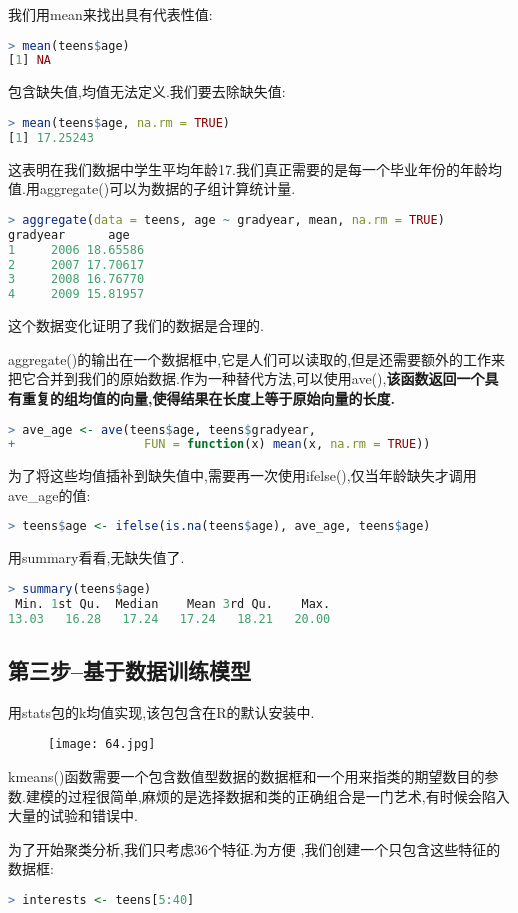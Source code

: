 \documentclass[11pt,a4paper,oneside]{book}
\begin{document}
我们用mean来找出具有代表性值:
\begin{lstlisting}[language=r]
> mean(teens$age) 
[1] NA
\end{lstlisting}
包含缺失值,均值无法定义.我们要去除缺失值:
\begin{lstlisting}[language=r]
> mean(teens$age, na.rm = TRUE) 
[1] 17.25243
\end{lstlisting}
这表明在我们数据中学生平均年龄17.我们真正需要的是每一个毕业年份的年龄均值.用aggregate()可以为数据的子组计算统计量.
\begin{lstlisting}[language=r]
> aggregate(data = teens, age ~ gradyear, mean, na.rm = TRUE)
gradyear      age
1     2006 18.65586
2     2007 17.70617
3     2008 16.76770
4     2009 15.81957
\end{lstlisting}
这个数据变化证明了我们的数据是合理的.

aggregate()的输出在一个数据框中,它是人们可以读取的,但是还需要额外的工作来把它合并到我们的原始数据.作为一种替代方法,可以使用ave(),\textbf{该函数返回一个具有重复的组均值的向量,使得结果在长度上等于原始向量的长度.}
\begin{lstlisting}[language=r]
> ave_age <- ave(teens$age, teens$gradyear,
+                  FUN = function(x) mean(x, na.rm = TRUE))
\end{lstlisting}

为了将这些均值插补到缺失值中,需要再一次使用ifelse(),仅当年龄缺失才调用ave\_age的值:
\begin{lstlisting}[language=r]
> teens$age <- ifelse(is.na(teens$age), ave_age, teens$age)
\end{lstlisting}
用summary看看,无缺失值了.
\begin{lstlisting}[language=r]
> summary(teens$age)
 Min. 1st Qu.  Median    Mean 3rd Qu.    Max. 
13.03   16.28   17.24   17.24   18.21   20.00 
\end{lstlisting}

\subsection{第三步--基于数据训练模型}
用stats包的k均值实现,该包包含在R的默认安装中.
\begin{figure}[H]
	\centering
	\texttt{[image: 64.jpg]}
\end{figure}
kmeans()函数需要一个包含数值型数据的数据框和一个用来指类的期望数目的参数.建模的过程很简单,麻烦的是选择数据和类的正确组合是一门艺术,有时候会陷入大量的试验和错误中.

为了开始聚类分析,我们只考虑36个特征.为方便 ,我们创建一个只包含这些特征的数据框:
\begin{lstlisting}[language=r]
> interests <- teens[5:40]
\end{lstlisting}
\end{document}
